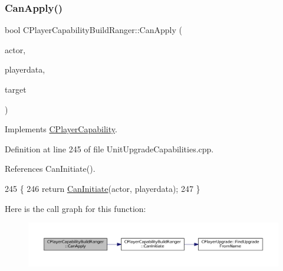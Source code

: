 \subsubsection{\texorpdfstring{Can\+Apply()}{CanApply()}}
{\footnotesize\ttfamily bool C\+Player\+Capability\+Build\+Ranger\+::\+Can\+Apply (\begin{DoxyParamCaption}\item[{std\+::shared\+\_\+ptr$<$ \hyperlink{classCPlayerAsset}{C\+Player\+Asset} $>$}]{actor,  }\item[{std\+::shared\+\_\+ptr$<$ \hyperlink{classCPlayerData}{C\+Player\+Data} $>$}]{playerdata,  }\item[{std\+::shared\+\_\+ptr$<$ \hyperlink{classCPlayerAsset}{C\+Player\+Asset} $>$}]{target }\end{DoxyParamCaption})\hspace{0.3cm}{\ttfamily [virtual]}}



Implements \hyperlink{classCPlayerCapability_ae96263e0950f496492f8baeb877b9554}{C\+Player\+Capability}.



Definition at line 245 of file Unit\+Upgrade\+Capabilities.\+cpp.



References Can\+Initiate().


\begin{DoxyCode}
245                                                                                                            
                                                        \{
246     \textcolor{keywordflow}{return} \hyperlink{classCPlayerCapabilityBuildRanger_ad8b45a3ffc7ee82d5550cc690823d82c}{CanInitiate}(actor, playerdata);
247 \}
\end{DoxyCode}
Here is the call graph for this function\+:\nopagebreak
\begin{figure}[H]
\begin{center}
\leavevmode
\includegraphics[width=350pt]{classCPlayerCapabilityBuildRanger_a2e688d8f68ab53402afe9303dd28754a_cgraph}
\end{center}
\end{figure}
\hypertarget{classCPlayerCapabilityBuildRanger_ad8b45a3ffc7ee82d5550cc690823d82c}{}\label{classCPlayerCapabilityBuildRanger_ad8b45a3ffc7ee82d5550cc690823d82c} 
